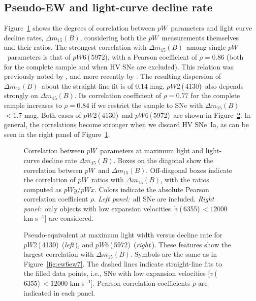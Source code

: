\documentclass[apj]{emulateapj-rtx4}
\newcommand{\ew}{$pW$}
\newcommand{\pwtwo}{$pW$2\,(\ion{Si}{2}\,4130)}
\newcommand{\pwsix}{$pW$6\,(\ion{Si}{2}\,5972)}
\newcommand{\vsix}{$v$\,(\ion{Si}{2}\,6355)}
\newcommand{\dm}{$\Delta m_{15}(B)$}
\newcommand{\sneia}{SNe~Ia}
\begin{document}
\subsection{Pseudo-EW and light-curve decline rate}
\label{sec:ewdm}

Figure~\ref{fig:ewdmcorr} shows the degrees of correlation between
\ew\ parameters and light curve decline rates, \dm, considering both
the \ew\ measurements themselves and their ratios. The
strongest correlation with \dm\ among single \ew\ parameters is that of
\pwsix, with a Pearson coefficient of $\rho = 0.86$ (both for the
  complete sample and when HV SNe are excluded). This relation was previously noted by
\citet{hachinger06}, and more recently by
  \citet{silverman12c}. The resulting dispersion of \dm\ about the  
straight-line fit is of $0.14$ mag. \pwtwo\ also depends strongly on
\dm. Its correlation coefficient of $\rho = 0.77$ for the complete
sample increases to $\rho = 0.84$ if we restrict the
sample to SNe with \dm\,$<1.7$ mag. Both cases of \pwtwo\ and
\pwsix\ are shown in Figure~\ref{fig:ew26dm}. In general, the
correlations become stronger when we discard HV \sneia, as can be seen
in the right panel of Figure~\ref{fig:ewdmcorr}. 

\begin{figure}[htpb]%
\caption{Correlation between \ew\ parameters at maximum
  light and light-curve decline rate \dm. Boxes on the diagonal
  show the correlation between \ew\ and \dm. Off-diagonal boxes
  indicate the correlation of \ew\ ratios with \dm, with the ratios
  computed as $pWy/pWx$. Colors indicate the
  absolute Pearson correlation coefficient $\rho$. {\em Left
    panel:\,} all SNe are included. {\em Right panel:\,} only objects
  with low expansion velocities [\vsix\,$<12000$ km s$^{-1}$]
  are considered.\label{fig:ewdmcorr}}  
\end{figure}

\begin{figure}[htpb]%
\caption{Pseudo-equivalent at maximum light width versus decline rate
  for \pwtwo\ ({\em left\,}), and \pwsix\ ({\em right\,}). These features
  show the largest correlation with \dm. Symbols are the same as in
  Figure~\ref{fig:ew6ew7}. The dashed lines indicate straight-line
  fits to the filled data points, i.e., SNe with low expansion
  velocities [\vsix\,$<12000$ km s$^{-1}$]. Pearson correlation
  coefficients $\rho$ are indicated in each panel.\label{fig:ew26dm}}
\end{figure}
\end{document}
